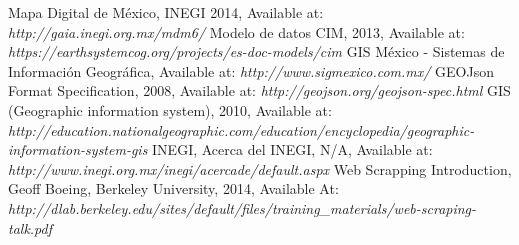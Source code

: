 \begin{thebibliography}{1}
		Mapa Digital de México, INEGI 2014, Available at: \emph{http://gaia.inegi.org.mx/mdm6/}
	   Modelo de datos CIM, 2013, Available at: \emph{https://earthsystemcog.org/projects/es-doc-models/cim}
		 GIS México - Sistemas de Información Geográfica, Available at: \emph{http://www.sigmexico.com.mx/}
	     GEOJson Format Specification, 2008, Available at: \emph{http://geojson.org/geojson-spec.html}
		 GIS (Geographic information system), 2010, Available at: \emph{http://education.nationalgeographic.com/education/encyclopedia/geographic-information-system-gis}
		INEGI, Acerca del INEGI, N/A, Available at: \emph{http://www.inegi.org.mx/inegi/acercade/default.aspx}
		Web Scrapping Introduction, Geoff Boeing, Berkeley University, 2014, Available At: \emph{http://dlab.berkeley.edu/sites/default/files/training_materials/web-scraping-talk.pdf}
\end{thebibliography}